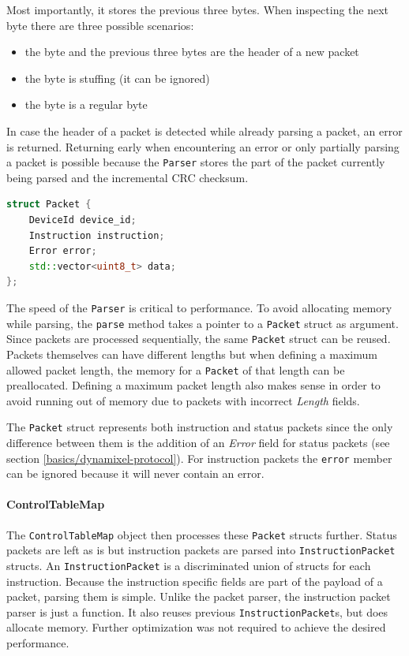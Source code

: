 Most importantly, it stores the previous three bytes. When inspecting the next byte there are three
possible scenarios:

\begin{itemize}
    \item the byte and the previous three bytes are the header of a new packet
    \item the byte is stuffing (it can be ignored)
    \item the byte is a regular byte
\end{itemize}

In case the header of a packet is detected while already parsing a packet, an error is returned.
Returning early when encountering an error or only partially parsing a packet is possible because
the \lstinline{Parser} stores the part of the packet currently being parsed and the incremental
CRC checksum.

\begin{lstlisting}[language=C++, caption={Definition of the \lstinline{Packet} struct}]
struct Packet {
    DeviceId device_id;
    Instruction instruction;
    Error error;
    std::vector<uint8_t> data;
};
\end{lstlisting}

The speed of the \lstinline{Parser} is critical to performance. To avoid allocating memory while
parsing, the \lstinline{parse} method takes a pointer to a \lstinline{Packet} struct as argument.
Since packets are processed sequentially, the same \lstinline{Packet} struct can be reused. Packets
themselves can have different lengths but when defining a maximum allowed packet length, the memory
for a \lstinline{Packet} of that length can be preallocated. Defining a maximum packet length also
makes sense in order to avoid running out of memory due to packets with incorrect \textit{Length}
fields.

The \lstinline{Packet} struct represents both instruction and status packets since the only difference
between them is the addition of an \textit{Error} field for status packets (see section
\ref{basics/dynamixel-protocol}). For instruction packets the \lstinline{error} member can be ignored
because it will never contain an error.

\paragraph{ControlTableMap}

The \lstinline{ControlTableMap} object then processes these \lstinline{Packet} structs further.
Status packets are left as is but instruction packets are parsed into \lstinline{InstructionPacket}
structs. An \lstinline{InstructionPacket} is a discriminated union of structs for each instruction.
Because the instruction specific fields are part of the payload of a packet, parsing them is simple.
Unlike the packet parser, the instruction packet parser is just a function. It also reuses previous
\lstinline{InstructionPacket}s, but does allocate memory. Further optimization was not required to
achieve the desired performance.

